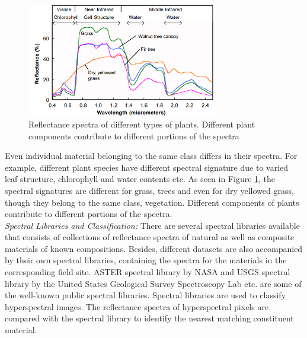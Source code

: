 \documentclass[12pt,twoside]{article}
\theoremstyle{plain}
\theoremstyle{definition}
\theoremstyle{remark}
\newcommand{\forceindent}{\leavevmode{\parindent=2em\indent}}
\begin{document}
\begin{figure}[hbtp]
\centering
\includegraphics[width=0.75\textwidth]{src/plant_spectra.png}
\caption{Reflectance spectra of different types of plants. Different plant components contribute to different portions of the spectra \cite{smith2012} }
\label{fig:plant_spec}
\end{figure}
Even individual material belonging to the same class differs in their spectra. For example, different plant species have different spectral signature due to varied leaf structure, chlorophyll and water contents etc. As seen in Figure \ref{fig:plant_spec}, the spectral signatures are different for grass, trees and even for dry yellowed grass, though they belong to the same class, vegetation. Different components of plants contribute to different portions of the spectra.\\
\forceindent \textit{Spectral Libraries and Classification:} There are several spectral libraries available that consists of collections of reflectance spectra of natural as well as composite materials of known compositions. Besides, different datasets are also accompanied by their own spectral libraries, containing the spectra for the materials in the corresponding field site.  ASTER spectral library by NASA \cite{baldridge2009aster} and USGS spectral library by the United States Geological Survey Spectroscopy Lab \cite{clark1993us} etc. are some of the well-known public spectral libraries. Spectral libraries are used to classify hyperspectral images. The reflectance spectra of hyperspectral pixels are compared with the spectral library to identify the nearest matching constituent material.\\
\end{document}
